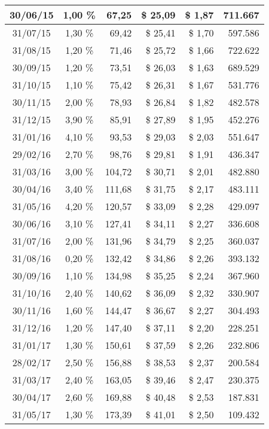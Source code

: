 \begin{center}
\begin{longtable}{|c|c|r|r|r|r|}
30/06/15 & 1,00 \% & 67,25 & \$ 25,09 & \$ 1,87 & 711.667 \\ \hline
31/07/15 & 1,30 \% & 69,42 & \$ 25,41 & \$ 1,70 & 597.586 \\ \hline
31/08/15 & 1,20 \% & 71,46 & \$ 25,72 & \$ 1,66 & 722.622 \\ \hline
30/09/15 & 1,20 \% & 73,51 & \$ 26,03 & \$ 1,63 & 689.529 \\ \hline
31/10/15 & 1,10 \% & 75,42 & \$ 26,31 & \$ 1,67 & 531.776 \\ \hline
30/11/15 & 2,00 \% & 78,93 & \$ 26,84 & \$ 1,82 & 482.578 \\ \hline
31/12/15 & 3,90 \% & 85,91 & \$ 27,89 & \$ 1,95 & 452.276 \\ \hline
31/01/16 & 4,10 \% & 93,53 & \$ 29,03 & \$ 2,03 & 551.647 \\ \hline
29/02/16 & 2,70 \% & 98,76 & \$ 29,81 & \$ 1,91 & 436.347 \\ \hline
31/03/16 & 3,00 \% & 104,72 & \$ 30,71 & \$ 2,01 & 482.880 \\ \hline
30/04/16 & 3,40 \% & 111,68 & \$ 31,75 & \$ 2,17 & 483.111 \\ \hline
31/05/16 & 4,20 \% & 120,57 & \$ 33,09 & \$ 2,28 & 429.097 \\ \hline
30/06/16 & 3,10 \% & 127,41 & \$ 34,11 & \$ 2,27 & 336.608 \\ \hline
31/07/16 & 2,00 \% & 131,96 & \$ 34,79 & \$ 2,25 & 360.037 \\ \hline
31/08/16 & 0,20 \% & 132,42 & \$ 34,86 & \$ 2,26 & 393.132 \\ \hline
30/09/16 & 1,10 \% & 134,98 & \$ 35,25 & \$ 2,24 & 367.960 \\ \hline
31/10/16 & 2,40 \% & 140,62 & \$ 36,09 & \$ 2,32 & 330.907 \\ \hline
30/11/16 & 1,60 \% & 144,47 & \$ 36,67 & \$ 2,27 & 304.493 \\ \hline
31/12/16 & 1,20 \% & 147,40 & \$ 37,11 & \$ 2,20 & 228.251 \\ \hline
31/01/17 & 1,30 \% & 150,61 & \$ 37,59 & \$ 2,26 & 232.806 \\ \hline
28/02/17 & 2,50 \% & 156,88 & \$ 38,53 & \$ 2,37 & 200.584 \\ \hline
31/03/17 & 2,40 \% & 163,05 & \$ 39,46 & \$ 2,47 & 230.375 \\ \hline
30/04/17 & 2,60 \% & 169,88 & \$ 40,48 & \$ 2,53 & 187.831 \\ \hline
31/05/17 & 1,30 \% & 173,39 & \$ 41,01 & \$ 2,50 & 109.432 \\ \hline

\end{longtable}
\end{center}
